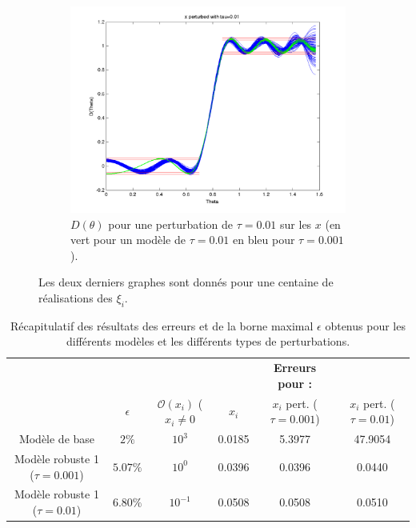 \begin{figure}[h!]
\begin{subfigure}[b]{0.45\textwidth}
  \end{subfigure}
  \begin{subfigure}[b]{0.45\textwidth}
  \includegraphics[width=\textwidth]{D-ModRobust1-test3Rob01.png}
  \caption{$D(\theta)$ pour une perturbation de $\tau = 0.01$ sur les $x$ (en vert pour un modèle de $\tau=0.01$ en bleu pour $\tau=0.001$).}
  \label{fig:D-ModRobust1-test3RobTau01}
  \end{subfigure}
\caption{Les deux derniers graphes sont donnés pour une centaine de réalisations des $\xi_i$.}
  \end{figure}

\begin{table}
\centering
\begin{tabular}{c|c|c|ccc}
 & & &  &\textbf{Erreurs pour : } &\\
 & $\epsilon$ & $\mathcal{O}( x_i)$ ($x_i\neq0$ &$x_i$ & $x_i$ pert. ($\tau=0.001$) & $x_i$ pert. ($\tau=0.01$) \\
 \hline
Modèle de base & $2\%$ & $10^3$ &0.0185 & 5.3977 & 47.9054 \\
Modèle robuste 1 ($\tau=0.001$) & $5.07 \%$ & $10^0$& 0.0396 & 0.0396  & 0.0440 \\
Modèle robuste 1 ($\tau=0.01$)  & $6.80 \%$ &$10^{-1}$ &0.0508 & 0.0508 & 0.0510 \\
\end{tabular}
\caption{Récapitulatif des résultats des erreurs et de la borne maximal $\epsilon$ obtenus pour les différents modèles et les différents types de perturbations.}
\label{table:Recap}
\end{table}
\FloatBarrier